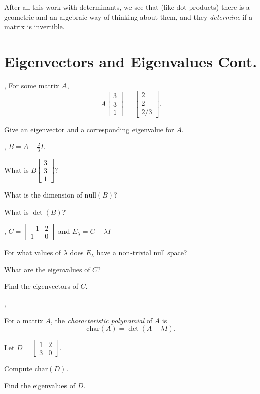 \documentclass[letter]{article}
\newcommand{\mat}[1]{\begin{bmatrix}#1\end{bmatrix}}
\newcommand{\chr}{\mathrm{char}}
\begin{document}
	After all this work with determinants, we see 
	that (like dot products) there is a geometric and an
	algebraic way of thinking about them, and they 
	\emph{determine} if a matrix is invertible.

\newpage
\section*{Eigenvectors and Eigenvalues Cont.}

	\sep
	For some matrix $A$,
	\[
		A\mat{3\\3\\1}=\mat{2\\2\\2/3}.
	\]
	\begin{Enum}
		\item Give an eigenvector and a corresponding eigenvalue for $A$.
	\end{Enum}

	\sep
	$B=A-\frac{2}{3}I$.
	\begin{Enum}
		\item What is $B\mat{3\\3\\1}$?
		\item What is the dimension of $\text{null}(B)$?
		\item What is $\det(B)$?
	\end{Enum}

	\sep
	$C=\mat{-1&2\\1&0}$ and $E_\lambda = C-\lambda I$
	\begin{Enum}
		\item For what values of $\lambda$ does $E_\lambda$ have a non-trivial
			null space?
		\item What are the eigenvalues of $C$?
		\item Find the eigenvectors of $C$.
	\end{Enum}
	
	\sep
	\begin{Def}
	For a matrix $A$, the \emph{characteristic polynomial} of $A$ is
	\[
		\chr(A)=\det(A-\lambda I).
	\]
	\vspace{-.3in}
	\end{Def}

	\vspace{.2in}
	Let $D=\mat{1&2\\3&0}$.
	\begin{Enum}
		\item Compute $\chr(D)$.
		\item Find the eigenvalues of $D$.
	\end{Enum}
\end{document}
